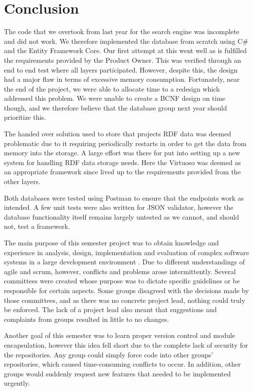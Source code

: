 \chapter{Conclusion}\label{ch:conclusion}
The code that we overtook from last year for the search engine was incomplete and did not work.
We therefore implemented the database from scratch using C\# and the Entity Framework Core.
Our first attempt at this went well as is fulfilled the requirements provided by the Product Owner. 
This was verified through an end to end test where all layers participated.
However, despite this, the design had a major flaw in terms of excessive memory consumption. 
Fortunately, near the end of the project, we were able to allocate time to a redesign which addressed this problem.
We were unable to create a BCNF design on time though, and we therefore believe that the database group next year should prioritize this.

The handed over solution used to store that \knox{} projects RDF data was deemed problematic due to it requiring periodically restarts in order to get the data from memory into the storage. A large effort was there for put into setting up a new system for handling \knox{} RDF data storage needs. 
Here the Virtuoso was deemed as an appropriate framework since lived up to the requirements provided from the other layers. 

Both databases were tested using Postman to ensure that the endpoints work as intended.
A few unit tests were also written for JSON validator, however the database functionality itself remains largely untested as we cannot, and should not, test a framework.

The main purpose of this semester project was to obtain knowledge and experience in analysis, design, implementation and evaluation of complex software systems in a large development environment \cite{AAULearningGoals5thSemester}.
Due to different understandings of agile and scrum, however, conflicts and problems arose intermittently.
Several committees were created whose purpose was to dictate specific guidelines or be responsible for certain aspects.
Some groups disagreed with the decisions made by those committees, and as there was no concrete project lead, nothing could truly be enforced. 
The lack of a project lead also meant that suggestions and complaints from groups resulted in little to no changes.


Another goal of this semester was to learn proper version control and module encapsulation, however this idea fell short due to the complete lack of security for the \knox{} repositories. 
Any group could simply force code into other groups' repositories, which caused time-consuming conflicts to occur.
In addition, other groups would suddenly request new features that needed to be implemented urgently.


